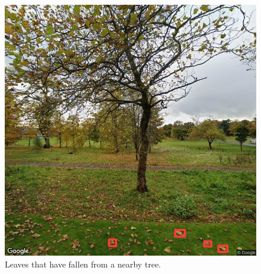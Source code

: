 \documentclass{thesis}
\begin{document}
\begin{appendices}
\begin{figure}[h]
    \centering
    \includegraphics[scale=0.45]{images/flaw-tree-leaves.jpg}
    \caption{Leaves that have fallen from a nearby tree.}
\end{figure}

\end{appendices}



\renewcommand{\thechapter}{0} %

\end{document}
